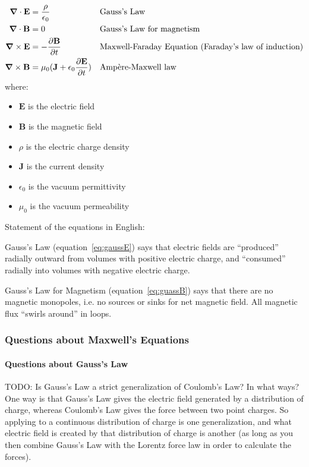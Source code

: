 \documentclass[a4paper]{article}
\theoremstyle{plain}
\theoremstyle{definition}
\newcommand{\vect}[1]{\textbf{#1}}
\begin{document}
\begin{align}
  \grad \cdot \vect{E} & = \frac{\rho}{\epsilon_0} & & \text{Gauss's Law} \label{eq:gaussE} \\
  \grad \cdot \vect{B} & = 0 & & \text{Gauss's Law for magnetism} \label{eq:gaussB} \\
  \grad \times \vect{E} & = - \frac{\partial \vect{B}}{\partial t} & & \text{Maxwell-Faraday Equation (Faraday's law of induction)} \label{eq:maxfar} \\
  \grad \times \vect{B} & = \mu_0 ( \vect{J} + \epsilon_0 \frac{\partial \vect{E}}{\partial t} ) & & \text{Amp\`{e}re-Maxwell law} \label{eq:ampmax}
\end{align}
where:
\begin{itemize}
  \item $\vect{E}$ is the electric field
  \item $\vect{B}$ is the magnetic field
  \item $\rho$ is the electric charge density
  \item $\vect{J}$ is the current density
  \item $\epsilon_0$ is the vacuum permittivity
  \item $\mu_0$ is the vacuum permeability
\end{itemize}

Statement of the equations in English:

Gauss's Law (equation~\eqref{eq:gaussE}) says that electric fields are
``produced'' radially outward from volumes with positive electric
charge, and ``consumed'' radially into volumes with negative electric
charge.

Gauss's Law for Magnetism (equation~\eqref{eq:guassB}) says that there
are no magnetic monopoles, i.e. no sources or sinks for net magnetic
field.  All magnetic flux ``swirls around'' in loops.

\subsubsection{Questions about Maxwell's Equations}

\paragraph{Questions about Gauss's Law}

TODO: Is Gauss's Law a strict generalization of Coulomb's Law?  In
what ways?  One way is that Gauss's Law gives the electric field
generated by a distribution of charge, whereas Coulomb's Law gives the
force between two point charges.  So applying to a continuous
distribution of charge is one generalization, and what electric field
is created by that distribution of charge is another (as long as you
then combine Gauss's Law with the Lorentz force law in order to
calculate the forces).
\end{document}
